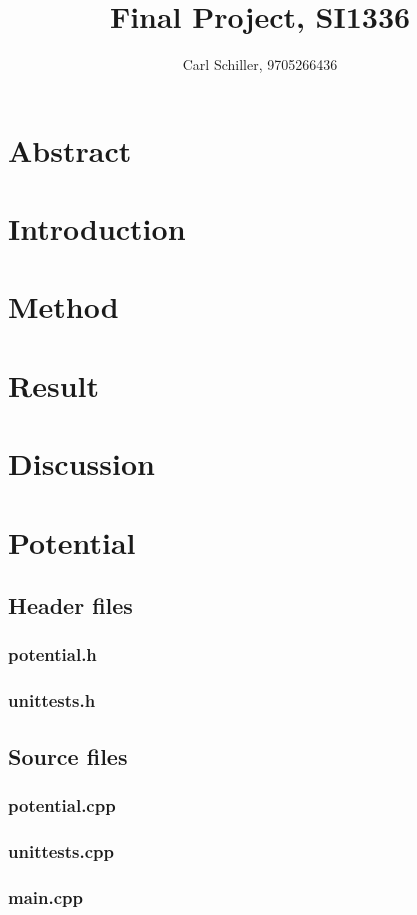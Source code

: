 \documentclass{article}
\author{Carl Schiller, 9705266436}
\title{Final Project, SI1336}
\begin{document}
\maketitle

\section*{Abstract}

\tableofcontents

\section{Introduction}

\section{Method}

\section{Result}

\section{Discussion}

\pagebreak
\appendix

\section{Potential}
  \subsection{Header files}
    \subsubsection{potential.h}
    \subsubsection{unittests.h}
  \subsection{Source files}
    \subsubsection{potential.cpp}
    \subsubsection{unittests.cpp}
    \subsubsection{main.cpp}
\end{document}
